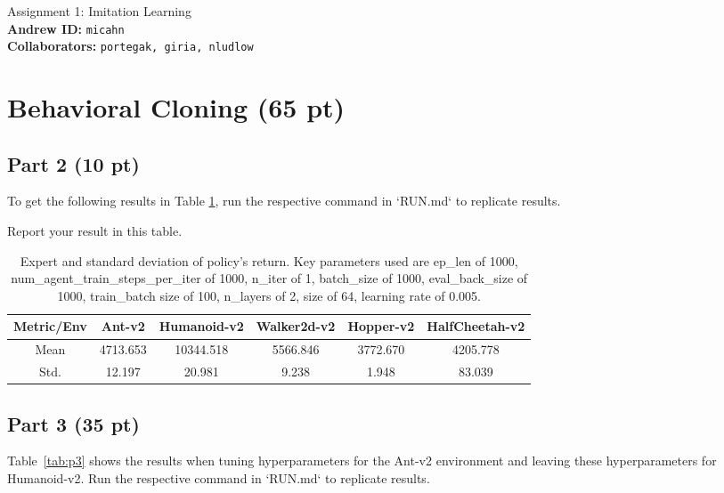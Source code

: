 \documentclass{article}
\newcommand{\tref}[1]{Table~\ref{#1}}
\begin{document}

\begin{centering}
    {\Large Assignment 1: Imitation Learning} \\
    \vspace{.25cm}
    \textbf{Andrew ID:} \texttt{micahn} \\
    \textbf{Collaborators:} \texttt{portegak, giria, nludlow}\\ 
\end{centering}

\vspace{.5cm}

\section{Behavioral Cloning (65 pt)}
\subsection{Part 2 (10 pt)}

To get the following results in Table \ref{tab:p2}, run the respective command in `RUN.md` to replicate results.


\begin{table}[!h]
  \centering
  \caption{Report your result in this table.}
    \begin{tabular}{cccccc}
    \toprule[1.0pt]
    Metric/Env & Ant-v2 & Humanoid-v2 & Walker2d-v2 & Hopper-v2 & HalfCheetah-v2 \\
    \midrule
    Mean  & 4713.653 & 10344.518 & 5566.846 & 3772.670 & 4205.778 \\
    Std.  & 12.197 & 20.981 & 9.238  & 1.948  & 83.039 \\
    \bottomrule[1.0pt]
    \end{tabular}%
    \caption{Expert and standard deviation of policy's return. Key parameters used are ep\_len of 1000, num\_agent\_train\_steps\_per\_iter of 1000, n\_iter of 1, batch\_size of 1000, eval\_back\_size of 1000, train\_batch size of 100, n\_layers of 2, size of 64, learning rate of 0.005.}
  \label{tab:p2}%
\end{table}%

\subsection{Part 3 (35 pt)}
\tref{tab:p3} shows the results when tuning hyperparameters for the Ant-v2 environment and leaving these hyperparameters for Humanoid-v2. Run the respective command in `RUN.md` to replicate results.
\end{document}
